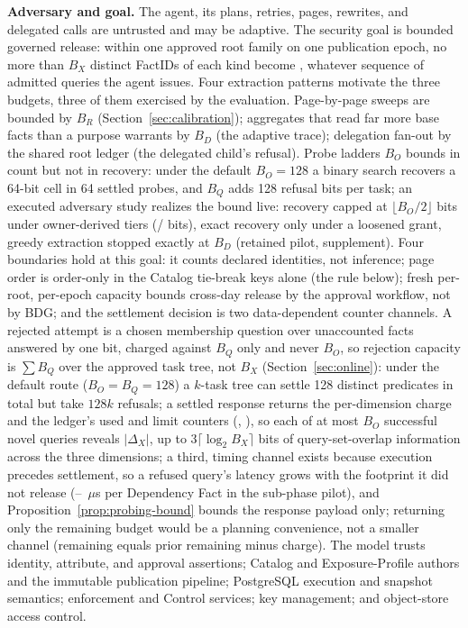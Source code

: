 \documentclass[10pt,journal,compsoc]{IEEEtran}
\newcommand{\code}[1]{\texttt{\detokenize{#1}}}
\begin{document}
\textbf{Adversary and goal.} The agent, its plans, retries, pages, rewrites,
and delegated calls are untrusted and may be adaptive. The security goal is
bounded governed release: within one approved root family on one publication
epoch, no more than $B_X$ distinct FactIDs of each kind become
\code{AVAILABLE}, whatever sequence of admitted queries the agent issues.
Four extraction patterns motivate the three budgets, three of them
exercised by the evaluation. Page-by-page sweeps are bounded by $B_R$
(Section~\ref{sec:calibration}); aggregates that read far more base facts
than a purpose warrants by $B_D$ (the adaptive trace); delegation fan-out
by the shared root ledger (the delegated child's refusal). Probe ladders
$B_O$ bounds in count but not in recovery: under the default $B_O=128$ a
binary search recovers a 64-bit cell in 64 settled probes, and $B_Q$ adds
128 refusal bits per task; an executed adversary study realizes the bound
live: recovery capped at $\lfloor B_O/2\rfloor$ bits under owner-derived
tiers (\FinalVFiveAdversaryOwnerBits{}/\FinalVFiveAdversaryTightenedBits{}
bits), exact recovery only under a loosened grant, greedy extraction
stopped exactly at $B_D$ (retained pilot, supplement). Four
boundaries hold at this goal: it counts declared identities, not inference;
page order is order-only in the Catalog tie-break keys alone (the
\code{ORDER BY} rule below); fresh per-root, per-epoch capacity bounds
cross-day release by the approval workflow, not by BDG; and the settlement
decision is two data-dependent counter channels. A rejected attempt is a chosen membership
question over unaccounted facts answered by one bit, charged against $B_Q$
only and never $B_O$, so rejection capacity is $\sum B_Q$ over the approved
task tree, not $B_X$ (Section~\ref{sec:online}): under the default route
($B_O{=}B_Q{=}128$) a $k$-task tree can settle 128 distinct predicates in
total but take $128k$ refusals; a settled response returns
the per-dimension charge and the ledger's used and limit counters
(\code{exposure}, \code{exposure_budget}), so each of at most $B_O$
successful novel queries reveals $|\Delta_X|$, up to $3\lceil\log_2
B_X\rceil$ bits of query-set-overlap information across the three
dimensions; a third, timing channel exists because execution precedes
settlement, so a refused query's latency grows with the footprint it did
not release (\FinalVFiveSubphaseMicrosPerFactSTwoSFTen{}--\FinalVFiveSubphaseMicrosPerFactSSixHundredKByteSixteen{}~$\mu$s
per Dependency Fact in the sub-phase pilot), and
Proposition~\ref{prop:probing-bound} bounds the response payload only;
returning only the
remaining budget would be a planning convenience, not a smaller channel
(remaining equals prior remaining minus charge). The model
trusts identity, attribute, and approval assertions; Catalog and
Exposure-Profile authors and the immutable publication pipeline; PostgreSQL
execution and snapshot semantics; enforcement and Control services; key
management; and object-store access control.
\end{document}
